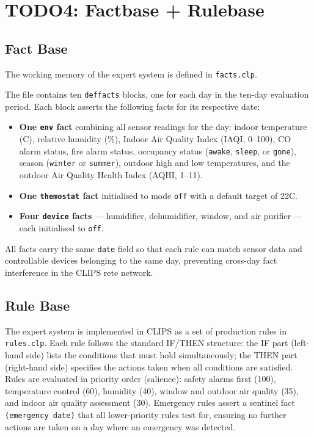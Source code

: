 \documentclass{article}
\begin{document}
\section{TODO4: Factbase + Rulebase}

\subsection{Fact Base}

The working memory of the expert system is defined in \texttt{facts.clp}.

The file contains ten \texttt{deffacts} blocks, one for each day in the ten-day evaluation period. Each block asserts the following facts for its respective date:

\begin{itemize}
    \item \textbf{One \texttt{env} fact} combining all sensor readings for the day: indoor temperature (\textdegree C), relative humidity (\%), Indoor Air Quality Index (IAQI, 0--100), CO alarm status, fire alarm status, occupancy status (\texttt{awake}, \texttt{sleep}, or \texttt{gone}), season (\texttt{winter} or \texttt{summer}), outdoor high and low temperatures, and the outdoor Air Quality Health Index (AQHI, 1--11).
    \item \textbf{One \texttt{themostat} fact} initialised to mode \texttt{off} with a default target of 22\textdegree C.
    \item \textbf{Four \texttt{device} facts} — humidifier, dehumidifier, window, and air purifier — each initialised to \texttt{off}.
\end{itemize}

All facts carry the same \texttt{date} field so that each rule can match sensor data and controllable devices belonging to the same day, preventing cross-day fact interference in the CLIPS rete network.

\subsection{Rule Base}

The expert system is implemented in CLIPS as a set of production rules in \texttt{rules.clp}. Each rule follows the standard IF/THEN structure: the IF part (left-hand side) lists the conditions that must hold simultaneously; the THEN part (right-hand side) specifies the actions taken when all conditions are satisfied. Rules are evaluated in priority order (salience): safety alarms first (100), temperature control (60), humidity (40), window and outdoor air quality (35), and indoor air quality assessment (30). Emergency rules assert a sentinel fact \texttt{(emergency date)} that all lower-priority rules test for, ensuring no further actions are taken on a day where an emergency was detected.
\end{document}

